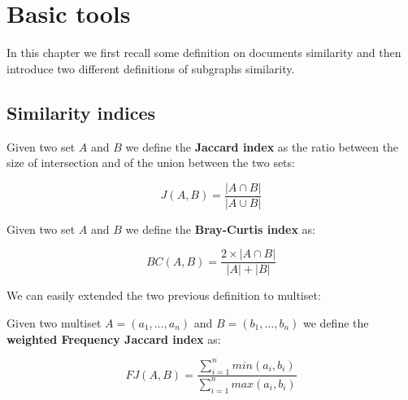 


\chapter{Basic tools}

In this chapter we first recall some definition on documents similarity and then introduce two different definitions of subgraphs similarity.



\section{Similarity indices}

\begin{definizione}\label{def:jaccard}
    Given two set $A$ and $B$ we define the \textbf{Jaccard index} as the ratio between the size of intersection and of the union between the two sets:
    
    \begin{equation}
    J(A,B) = \frac{|A \cap B|}{|A \cup B|}
    \end{equation}
    
\end{definizione}

\begin{definizione}\label{def:bray}
    Given two set $A$ and $B$ we define the \textbf{Bray-Curtis index} as:
    
    \begin{equation}
    BC(A,B) = \frac{2 \times |A \cap B|}{|A| + |B|}
    \end{equation}
    
\end{definizione}

We can easily extended the two previous definition to multiset:

\begin{definizione}\label{def:wjaccard}
    Given two multiset $A = (a_{1}, \ldots, a_{n}) $ and $B = (b_{1}, \ldots, b_{n})$ we define the \textbf{weighted Frequency Jaccard index} as:
    
    \begin{equation}
    FJ(A,B) = \frac{\sum\limits_{i=1}^n { min(a_{i}, b_{i}) } }{\sum\limits_{i=1}^n { max(a_{i}, b_{i}) }}
    \end{equation}
    
\end{definizione}

